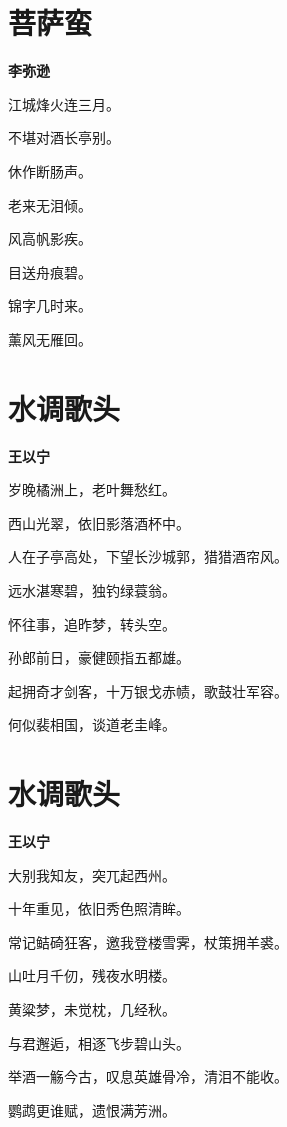 \documentclass[12pt,a4paper]{ctexbook}
\begin{document}
\section{菩萨蛮}
\textbf{李弥逊}\par\vspace{0.5em}
江城烽火连三月。\par
不堪对酒长亭别。\par
休作断肠声。\par
老来无泪倾。\par
风高帆影疾。\par
目送舟痕碧。\par
锦字几时来。\par
薰风无雁回。\par

\section{水调歌头}
\textbf{王以宁}\par\vspace{0.5em}
岁晚橘洲上，老叶舞愁红。\par
西山光翠，依旧影落酒杯中。\par
人在子亭高处，下望长沙城郭，猎猎酒帘风。\par
远水湛寒碧，独钓绿蓑翁。\par
怀往事，追昨梦，转头空。\par
孙郎前日，豪健颐指五都雄。\par
起拥奇才剑客，十万银戈赤帻，歌鼓壮军容。\par
何似裴相国，谈道老圭峰。\par

\section{水调歌头}
\textbf{王以宁}\par\vspace{0.5em}
大别我知友，突兀起西州。\par
十年重见，依旧秀色照清眸。\par
常记鲒碕狂客，邀我登楼雪霁，杖策拥羊裘。\par
山吐月千仞，残夜水明楼。\par
黄粱梦，未觉枕，几经秋。\par
与君邂逅，相逐飞步碧山头。\par
举酒一觞今古，叹息英雄骨冷，清泪不能收。\par
鹦鹉更谁赋，遗恨满芳洲。\par
\end{document}
